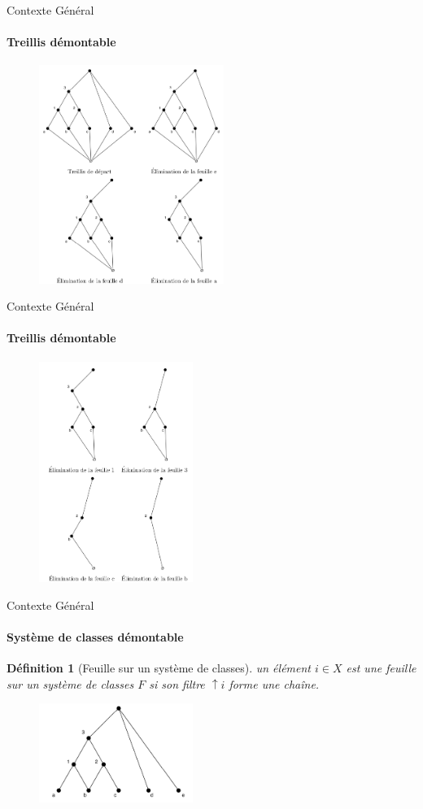 \documentclass{beamer}
\newtheorem{de}{Définition}
\begin{document}
  \begin{frame}{Contexte Général}
  \framesubtitle{Treillis démontable}
   \begin{figure}
	\includegraphics[width=6cm]{images/e_tr_1.png} 
    \end{figure}
  \end{frame}

  \begin{frame}{Contexte Général}
  \framesubtitle{Treillis démontable}
   \begin{figure}
	\includegraphics[width=5cm]{images/e_tr_2.png} 
    \end{figure}
  \end{frame}

  \begin{frame}{Contexte Général}
  \framesubtitle{Système de classes démontable}
  \begin{de}[Feuille sur un système de classes]
  un élément $i \in X$ est une feuille sur un système de classes $F$ si son filtre  $\uparrow i$ forme une cha\^ine.
  \end{de}
   \begin{figure}
	\includegraphics[width=5cm]{images/fl.png} 
    \end{figure}
  \end{frame}
\end{document}
